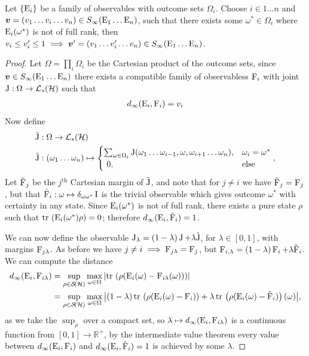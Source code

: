 \begin{lem}
  \label{lem:infty-increase-error}
  Let $\{\operatorname{E}_i\}$ be a family of observables with outcome sets $\Omega_i$. Choose $i\in 1\hdots n$ and $\bm{v} = (v_1\hdots v_i\hdots v_n) \in S_\infty(\operatorname{E}_1\hdots\operatorname{E}_n)$, such that there exists some $\omega^*\in\Omega_i$ where $\operatorname{E}_i(\omega^*)$ is not of full rank, then $v_i \leq v_i^\prime \leq 1 \implies \bm{v}^\prime = (v_1\hdots v_i^\prime\hdots v_n) \in S_\infty(\operatorname{E}_1\hdots\operatorname{E}_n)$.
  \begin{proof}
    Let $\Omega = \prod_i \Omega_i$ be the Cartesian product of the outcome sets, since $\bm{v}\in S_\infty(\operatorname{E}_1\hdots\operatorname{E}_n)$ there exists a compatible family of observabless $\operatorname{F}_i$ with joint $\opj:\Omega\to\saops[\hcal]$ such that
    \begin{align}
      d_\infty(\operatorname{E}_i, \operatorname{F}_i) = v_i
    \end{align}
    Now define
    \begin{align}
      \tilde{\opj}&:\Omega\to \saops[\hcal]\\
      \tilde{\opj}&:(\omega_1\hdots\omega_{n}) \mapsto \begin{cases}\sum_{\omega\in\Omega_i} \opj(\omega_1\hdots\omega_{i-1},\omega,\omega_{i+1}\hdots\omega_{n}), & \omega_i = \omega^*\\\ 0,&\text{else}\end{cases},
    \end{align}
    Let $\tilde{\operatorname{F}}_j$ be the $j^\text{th}$ Cartesian margin of $\tilde{\operatorname{J}}$, and note that for $j\neq i$ we have $\tilde{\operatorname{F}}_j = \operatorname{F}_j$, but that $\tilde{\operatorname{F}}_i:\omega\mapsto \delta_{\omega \omega^*}\operatorname{I}$ is the trivial observable which gives outcome $\omega^*$ with certainty in any state. Since $\operatorname{E}_i(\omega^*)$ is not of full rank, there exists a pure state $\rho$ such that $\tr{\ope_i(\omega^*)\rho} = 0$; therefore $d_\infty(\operatorname{E}_i, \tilde{\operatorname{F}}_i) = 1$.

    We can now define the observable $\operatorname{J}_\lambda = (1-\lambda) \operatorname{J} + \lambda \tilde{\operatorname{J}}$, for $\lambda\in[0,1]$, with margins $\operatorname{F}_{j \lambda}$. As before we have $j\neq i \implies \operatorname{F}_{j\lambda} = \operatorname{F}_j$, but $\operatorname{F}_{i,\lambda} = (1-\lambda)\operatorname{F}_i + \lambda \tilde{\operatorname{F}}_i$. We can compute the distance
    \begin{align}
      d_\infty(\ope_i, \opf_{i\lambda}) &= \sup_{\rho\in\dops[\hcal]}\max_{\omega\in\Omega} \abs{\tr{\rho(\ope_i(\omega) - \opf_{i\lambda}(\omega))}}\\
                                        &= \sup_{\rho\in\dops[\hcal]}\max_{\omega\in\Omega} \abs{(1-\lambda)\tr{\rho(\ope_i(\omega) - \opf_{i})} + \lambda\tr{\rho(\ope_i(\omega) - \tilde{\opf}_{i})}(\omega)},
    \end{align}
    as we take the $\sup_\rho$ over a compact set, so $\lambda\mapsto d_\infty(\operatorname{E}_i,\operatorname{F}_{i\lambda})$ is a continuous function from $[0,1]\to\mathbb{R}^+$, by the intermediate value theorem every value between $d_\infty(\operatorname{E}_i, \operatorname{F}_{i})$ and $d_\infty(\operatorname{E}_i, \tilde{\operatorname{F}}_i) = 1$ is achieved by some $\lambda$.
  \end{proof}
\end{lem}

